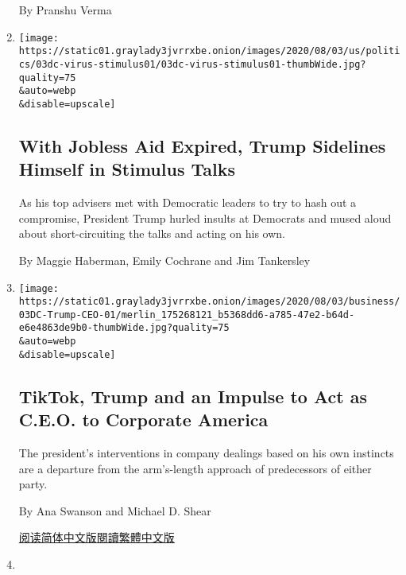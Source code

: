 \begin{enumerate}
  By Pranshu Verma
\item
  \href{/2020/08/03/us/politics/congress-jobless-aid-talks-trump.html}{}

  \texttt{[image: https://static01.graylady3jvrrxbe.onion/images/2020/08/03/us/politics/03dc-virus-stimulus01/03dc-virus-stimulus01-thumbWide.jpg?quality=75\\\&auto=webp\\\&disable=upscale]}

  \hypertarget{with-jobless-aid-expired-trump-sidelines-himself-in-stimulus-talks-1}{%
  \subsection{With Jobless Aid Expired, Trump Sidelines Himself in
  Stimulus
  Talks}\label{with-jobless-aid-expired-trump-sidelines-himself-in-stimulus-talks-1}}

  As his top advisers met with Democratic leaders to try to hash out a
  compromise, President Trump hurled insults at Democrats and mused
  aloud about short-circuiting the talks and acting on his own.

  By Maggie Haberman, Emily Cochrane and Jim Tankersley
\item
  \href{/2020/08/03/business/economy/trump-tiktok-china-business.html}{}

  \texttt{[image: https://static01.graylady3jvrrxbe.onion/images/2020/08/03/business/03DC-Trump-CEO-01/merlin\_175268121\_b5368dd6-a785-47e2-b64d-e6e4863de9b0-thumbWide.jpg?quality=75\\\&auto=webp\\\&disable=upscale]}

  \hypertarget{tiktok-trump-and-an-impulse-to-act-as-ceo-to-corporate-america}{%
  \subsection{TikTok, Trump and an Impulse to Act as C.E.O. to Corporate
  America}\label{tiktok-trump-and-an-impulse-to-act-as-ceo-to-corporate-america}}

  The president's interventions in company dealings based on his own
  instincts are a departure from the arm's-length approach of
  predecessors of either party.

  By Ana Swanson and Michael D. Shear

  \href{https://cn.nytimes3xbfgragh.onion/business/20200804/trump-tiktok-china-business/}{阅读简体中文版}\href{https://cn.nytimes3xbfgragh.onion/business/20200804/trump-tiktok-china-business/zh-hant/}{閱讀繁體中文版}
\item
  \href{/2020/08/03/us/politics/joe-biden-vp.html}{}


\end{enumerate}
